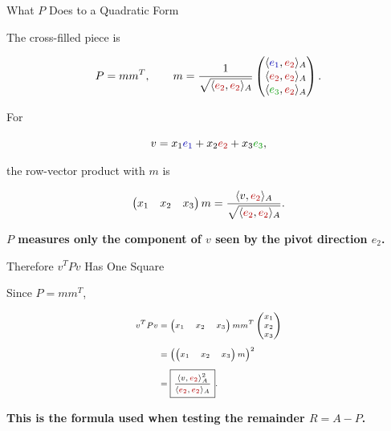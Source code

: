 \documentclass[10pt]{beamer}
\theoremstyle{definition}
\newcommand{\x}[1]{\alert{\textbf{#1}}}
\newcommand{\rd}[1]{{\color{red!70!black}#1}}
\newcommand{\bl}[1]{{\color{blue!70!black}#1}}
\newcommand{\gn}[1]{{\color{green!60!black}#1}}
\begin{document}
\begin{frame}[shrink=6]{What $P$ Does to a Quadratic Form}

The cross-filled piece is

$$
P=mm^T,\qquad
m=\frac1{\sqrt{\langle \rd{e_2},\rd{e_2}\rangle_A}}
\begin{pmatrix}
\langle \bl{e_1},\rd{e_2}\rangle_A\\
\langle \rd{e_2},\rd{e_2}\rangle_A\\
\langle \gn{e_3},\rd{e_2}\rangle_A
\end{pmatrix}.
$$

\vfill

For

$$
v=x_1\bl{e_1}+x_2\rd{e_2}+x_3\gn{e_3},
$$

the row-vector product with $m$ is

$$
\begin{pmatrix}x_1&x_2&x_3\end{pmatrix}m
=
\frac{\langle v,\rd{e_2}\rangle_A}
{\sqrt{\langle \rd{e_2},\rd{e_2}\rangle_A}}.
$$

\vfill

\begin{center}
\x{$P$ measures only the component of $v$ seen by the pivot direction $e_2$.}
\end{center}

\end{frame}


\begin{frame}[shrink=6]{Therefore $v^TPv$ Has One Square}

Since $P=mm^T$,

\[
\scriptsize
\begin{aligned}
v^TPv
&=
\begin{pmatrix}x_1&x_2&x_3\end{pmatrix}
mm^T
\begin{pmatrix}x_1\\x_2\\x_3\end{pmatrix}\\[0.4em]
&=
\left(
\begin{pmatrix}x_1&x_2&x_3\end{pmatrix}m
\right)^2\\[0.4em]
&=
\boxed{
\frac{\langle v,\rd{e_2}\rangle_A^2}
{\langle \rd{e_2},\rd{e_2}\rangle_A}}.
\end{aligned}
\]

\vfill

\begin{center}
\x{This is the formula used when testing the remainder $R=A-P$.}
\end{center}

\end{frame}
\end{document}
